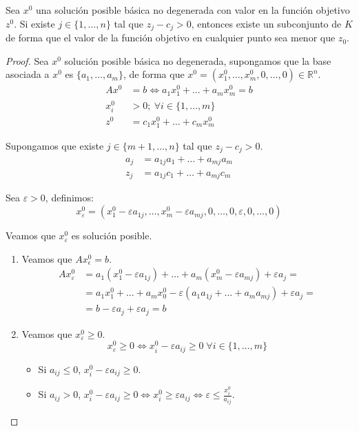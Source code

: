 \begin{theorem}
    Sea $x^0$ una solución posible básica no degenerada con valor en la función objetivo $z^0$.
    Si existe $j \in \{1, \dots, n\}$ tal que $z_j - c_j > 0$, entonces existe un subconjunto de $K$ de forma que el valor de la función objetivo en cualquier punto sea menor que $z_0$.
\end{theorem}

\begin{proof}
    Sea $x^0$ solución posible básica no degenerada, supongamos que la base asociada a $x^0$ es $\{a_1, \dots, a_m\}$, de forma que $x^0 = (x^0_1, \dots, x^0_m, 0, \dots, 0) \in \mathbb{R}^n$.
    \begin{align*}
        Ax^0  & = b \Leftrightarrow a_1x^0_1 + \dots + a_mx^0_m = b \\
        x^0_i & > 0 ;\ \forall i \in \{1, \dots, m\}                \\
        z^0   & = c_1x^0_1 + \dots + c_mx^0_m
    \end{align*}

    Supongamos que existe $j \in \{m+1, \dots, n\}$ tal que $z_j - c_j > 0$.
    \begin{align*}
        a_j & = a_{1j}a_1 + \dots + a_{mj}a_m \\
        z_j & = a_{1j}c_1 + \dots + a_{mj}c_m
    \end{align*}

    Sea $\varepsilon > 0$, definimos:
    $$x^0_\varepsilon = (x^0_1 - \varepsilon a_{1j}, \dots, x^0_m - \varepsilon a_{mj}, 0, \dots, 0, \varepsilon, 0, \dots, 0)$$

    Veamos que $x^0_\varepsilon$ es solución posible.
    \begin{enumerate}
        \item Veamos que $Ax^0_\epsilon = b$.
              \begin{align*}
                  Ax^0_\varepsilon & = a_1(x^0_1 - \varepsilon a_{1j}) + \dots + a_m(x^0_m - \varepsilon a_{mj}) + \varepsilon a_j = \\
                                   & = a_1x^0_1 + \dots + a_mx^0_0 - \varepsilon (a_1a_{1j} + \dots + a_ma_{mj}) + \varepsilon a_j = \\
                                   & = b - \varepsilon a_j + \varepsilon a_j = b
              \end{align*}
        \item Veamos que $x^0_\varepsilon \geq 0$.
              $$x^0_\varepsilon \geq 0 \Leftrightarrow x^0_i - \varepsilon a_{ij} \geq 0 \; \forall i \in \{1, \dots, m\}$$
              \begin{itemize}
                  \item Si $a_{ij} \leq 0$, $x^0_i - \varepsilon a_{ij} \geq 0$.
                  \item Si $a_{ij} > 0$, $x^0_i - \varepsilon a_{ij} \geq 0 \Leftrightarrow x^0_i \geq \varepsilon a_{ij} \Leftrightarrow \varepsilon \leq \frac{x^0_i}{a_{ij}}$.
              \end{itemize}
    \end{enumerate}


\end{proof}
